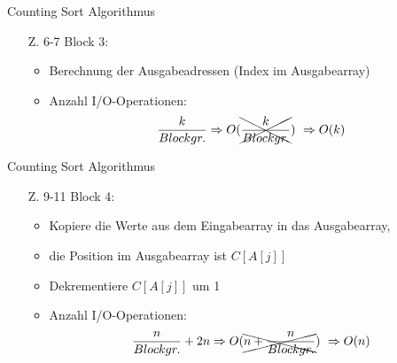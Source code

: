 \documentclass[handout]{beamer}
\begin{document}
\begin{frame}{Counting Sort Algorithmus}
  \begin{itemize}
    \item[Z. 6-7] Block 3:
    \begin{itemize}
      \item Berechnung der Ausgabeadressen (Index im Ausgabearray)
      \item Anzahl I/O-Operationen:
            \[
              \frac{k}{Blockgr.} \Rightarrow
              O(\xcancel{\frac{k}{Blockgr.}}) ~
              \Rightarrow O(k)
            \]
    \end{itemize}
  \end{itemize}
  \vspace{1cm}
  \begin{figure}
    \flushright
  \end{figure}
\end{frame}

\begin{frame}{Counting Sort Algorithmus}
  \begin{itemize}
    \item[Z. 9-11] Block 4:
    \begin{itemize}
      \item Kopiere die Werte aus dem Eingabearray in das Ausgabearray,
      \item die Position im Ausgabearray ist $C[A[j]]$
      \item Dekrementiere $C[A[j]]$ um 1
      \item Anzahl I/O-Operationen:
            \[
              \frac{n}{Blockgr.} + 2n \Rightarrow
              O(\xcancel{n + \frac{n}{Blockgr.}}) ~
              \Rightarrow O(n)
            \]
    \end{itemize}
  \end{itemize}

  \begin{figure}
    \flushright
  \end{figure}
\end{frame}
\end{document}
